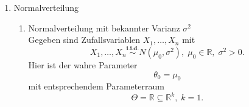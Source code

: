 \documentclass[10pt]{article}
\newcommand{\FZV}{X_1, \ldots, X_n} %
\newcommand{\IR}{\mathbb{R}} %
\newenvironment{BSP}[1][]
{\begin{Beispiel}[frametitle=#1]}{\end{Beispiel}}
\begin{document}
\begin{BSP}[Beispiel 1.1.2 (parametrische Modelle)]
\begin{enumerate}[label = (\roman*)]
			
			\item Normalverteilung
			\begin{enumerate}[label = (\alph*)] %
				\item Normalverteilung mit bekannter Varianz $\sigma^2$\\
				Gegeben sind Zufallsvariablen $\FZV$ mit
				\begin{equation*}
					\FZV \overset{\textbf{i.i.d.}} {\sim} N(\mu_0,\sigma^2),\; \mu_0 \in \IR, \; \sigma^2 >0.
				\end{equation*} 
				Hier ist der wahre Parameter 
				\begin{equation*}
					\theta_0 = \mu_0
				\end{equation*}
				mit entsprechendem Parameterraum
				\begin{equation*}
					\Theta = \IR \subseteq \IR^k,\; k=1.
				\end{equation*}
				

\end{enumerate}
\end{enumerate}
\end{BSP}
\end{document}
